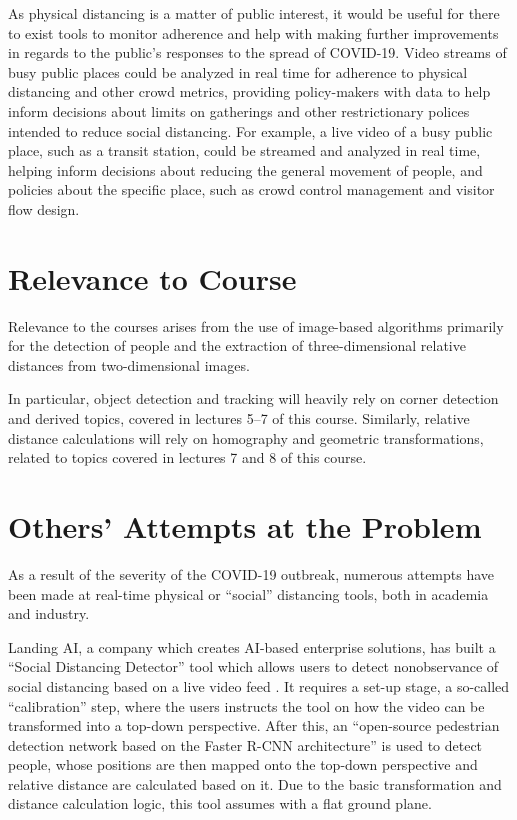 \documentclass{scrartcl}
\newcommand{\todo}[1]{\ifthenelse{\boolean{showtodo}}{
  \begin{tcolorbox}[colback=white,colframe=red,arc=1pt,outer arc=1pt,boxrule=1pt]\textcolor{red}{#1}\end{tcolorbox}
  {}}}
\begin{document}
As physical distancing is a matter of public interest,
it would be useful for there to exist tools to monitor adherence 
and help with making further improvements in regards to the public's responses to the spread of COVID-19.
Video streams of busy public places could be analyzed in real time for adherence to physical distancing
and other crowd metrics, 
providing policy-makers with data to help inform decisions about 
limits on gatherings and other restrictionary polices intended to reduce social distancing.
For example, a live video of a busy public place, such as a transit station, 
could be streamed and analyzed in real time,
helping inform decisions about reducing the general movement of people,
and policies about the specific place, 
such as crowd control management and visitor flow design.

\section{Relevance to Course}
\todo{How is this problem relevant to this course?}

Relevance to the courses arises from the use of image-based algorithms 
primarily for the detection of people and the extraction of three-dimensional 
relative distances from two-dimensional images. 

In particular, object detection and tracking will heavily rely on corner detection and derived topics,
covered in lectures 5--7 of this course.
Similarly, relative distance calculations will rely on homography and geometric transformations,
related to topics covered in lectures 7 and 8 of this course.

\section{Others' Attempts at the Problem}
\todo{What others have tried to solve this problem?} 

As a result of the severity of the COVID-19 outbreak,
numerous attempts have been made at real-time physical or ``social'' distancing
tools, both in academia and industry.

Landing AI, a company which creates AI-based enterprise solutions,
has built a ``Social Distancing Detector'' tool which allows users to detect 
nonobservance of social distancing based on a live video feed \cite{landingai}.
It requires a set-up stage, a so-called ``calibration'' step,
where the users instructs the tool on how the video can be transformed into a top-down perspective.
After this, an ``open-source pedestrian detection network based on the Faster R-CNN architecture''
is used to detect people, whose positions are then mapped onto the top-down perspective and 
relative distance are calculated based on it.
Due to the basic transformation and distance calculation logic,
this tool assumes with a flat ground plane.
\end{document}
